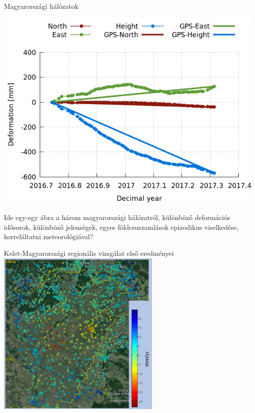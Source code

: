 \documentclass{beamer}
\begin{document}
\begin{frame}{Magyarországi hálózatok}
\begin{minipage}[c]{0.975\textwidth}
\begin{minipage}[c]{0.475\textwidth}
        \includegraphics[width=\textwidth]{IB4-IB1_kalman.png}
    \end{minipage}
    \begin{minipage}[c]{0.475\textwidth}
        Ide egy-egy ábra a három magyarországi hálózatról, különböző
        deformációs idősorok, különböző jelenségek, egyes földcsuszamlások
        epizodikus viselkedése, korreláltatni meteorológiával?
    \end{minipage}
\end{minipage}
\end{frame}


\begin{frame}{Kelet-Magyarországi regionális vizsgálat első eredményei}
\includegraphics[width=0.6\textwidth]{hun_nkp2.png}
\end{frame}
\end{document}
